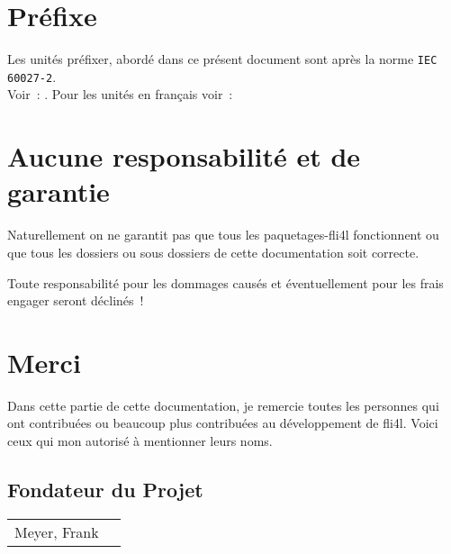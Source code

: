     \section{Préfixe}

    Les unités préfixer, abordé dans ce présent document sont après la norme
    \verb+IEC 60027-2+.\\
    Voir~: .
    Pour les unités en français voir~:


    \section{Aucune responsabilité et de garantie}

    Naturellement on ne garantit pas que tous les paquetages-fli4l
    fonctionnent ou que tous les dossiers ou sous dossiers de cette
    documentation soit correcte.
    
    Toute responsabilité pour les dommages causés et éventuellement pour
    les frais engager seront déclinés~!


    \section{Merci}
    \newcommand{\membermail}[3]{\multicolumn{2}{l}{#1 (\emph{#2})}\\\nopagebreak & \email{#3}\\}
    \newcommand{\member}[2]{#1 (\emph{#2})\\}
    \newcommand{\personmail}[2]{#1 & \email{#2}\\}
    \newcommand{\person}[1]{#1\\}

    Dans cette partie de cette documentation, je remercie toutes les personnes
    qui ont contribuées ou beaucoup plus contribuées au développement de fli4l.
    Voici ceux qui mon autorisé à mentionner leurs noms.

    \subsection{Fondateur du Projet}

    \begin{tabular}{ll}
      \person{Meyer, Frank}
    \end{tabular}\latex{\\}
    
    \noindent{}

